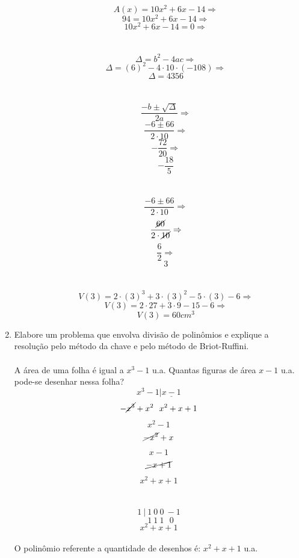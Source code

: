 \documentclass[a4paper, 12pt]{article}
\begin{document}
\begin{enumerate}
\begin{enumerate}
    $$ A(x) = 10x^2+6x-14 \Rightarrow $$
    $$ 94 = 10x^2+6x-14 \Rightarrow $$
    $$ 10x^2+6x-14 = 0 \Rightarrow $$ \\\\
    $$ \Delta = b^2-4ac \Rightarrow $$
    $$ \Delta = (6)^2-4\cdot10\cdot(-108) \Rightarrow $$
    $$ \Delta = 4356 $$ \\\\
    $$ \frac{-b \pm \sqrt{\Delta}}{2a} \Rightarrow $$
    $$ \frac{-6 \pm 66}{2\cdot10} \Rightarrow $$
    $$ - \frac{72}{20} \Rightarrow $$         
    $$ - \frac{18}{5} $$ \\\\
    $$ \frac{-6 \pm 66}{2\cdot10} \Rightarrow $$
    $$ \frac{\cancel{60}}{2\cdot\cancel{10}} \Rightarrow $$
    $$ \frac{6}{2} \Rightarrow $$
    $$ 3 $$ \\\\
    $$ V(3) = 2\cdot(3)^3 + 3\cdot(3)^2 - 5\cdot(3) - 6 \Rightarrow $$
    $$ V(3) = 2\cdot27 + 3\cdot9 - 15 - 6 \Rightarrow $$
    $$ \boxed{ V(3) = 60 cm^3} $$    
  \end{enumerate}
\item  Elabore um problema que envolva divisão de polinômios e explique a resolução pelo método da chave e pelo método de Briot-Ruffini.\\\\
  A área de uma folha é igual a $x^3-1 $ u.a. Quantas figuras de área $x-1$ u.a. pode-se desenhar nessa folha?\\
  $$ x^3-1 | \underline{x-1} $$ 
  $$ -\cancel{x^3}+x^2\ \ x^2+x+1 $$
  $$ x^2 - 1 $$ 
  $$ \cancel{-x^2} + x $$
  $$ x - 1 $$
  $$ \cancel{-x + 1} $$ 
  $$ \boxed{x^2+x+1} $$ \\\\ 
  $$ 1\ |\ 1\ 0\ 0\ -1 $$
  $$ \ \  1\ 1\ 1\ \ \ 0 $$
  $$ \boxed{x^2 + x + 1} $$ \\
  O polinômio referente a quantidade de desenhos é:  $ x^2+x+1 $ u.a.
  
\end{enumerate}
\end{document}
